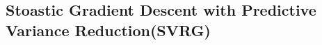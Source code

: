 \documentclass[]{book}
\theoremstyle{definition}
\begin{document}
\subsection*{Stoastic Gradient Descent with Predictive Variance Reduction(SVRG)}
% 
% 
%
%
%
%
\end{document}
